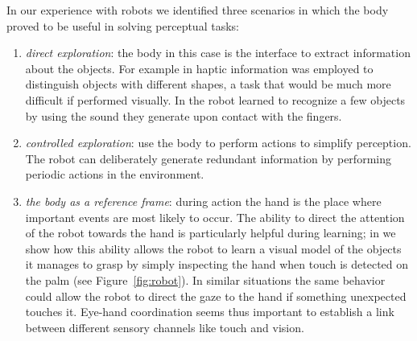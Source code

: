 In our experience with robots we identified three scenarios in which
the body proved to be useful in solving perceptual tasks:

\begin{enumerate}

\item {\em direct exploration}: the body in this case is the interface to
   extract information about the objects. For example in
   \cite{natale04learning} haptic information was employed to
   distinguish objects with different shapes, a task that would be much
   more difficult if performed visually. In
   \cite{torres-jara05tapping} the robot learned to recognize a few
   objects by using the sound they generate upon contact with the
   fingers.

\item {\em controlled exploration}: use the body to perform actions to simplify
   perception. The robot can deliberately generate redundant
   information by performing periodic actions in the environment.

\item {\em the body as a reference frame}: during action the hand is the place
   where important events are most likely to occur. The ability to
   direct the attention of the robot towards the hand is particularly
   helpful during learning; in \cite{natale05exploring} we show how
   this ability allows the robot to learn a visual model of the
   objects it manages to grasp by simply inspecting the hand when
   touch is detected on the palm (see Figure~\ref{fig:robot}). In
   similar situations the same behavior could allow the robot to
   direct the gaze to the hand if something unexpected touches
   it. Eye-hand coordination seems thus important to establish a link
   between different sensory channels like touch and vision.

\end{enumerate}




